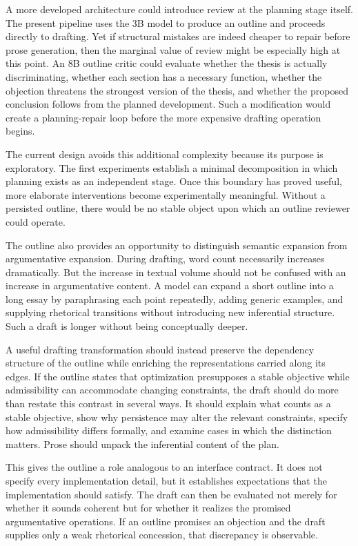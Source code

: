\documentclass[11pt]{article}
\begin{document}
A more developed architecture could introduce review at the planning stage itself. The present pipeline uses the 3B model to produce an outline and proceeds directly to drafting. Yet if structural mistakes are indeed cheaper to repair before prose generation, then the marginal value of review might be especially high at this point. An 8B outline critic could evaluate whether the thesis is actually discriminating, whether each section has a necessary function, whether the objection threatens the strongest version of the thesis, and whether the proposed conclusion follows from the planned development. Such a modification would create a planning-repair loop before the more expensive drafting operation begins.

The current design avoids this additional complexity because its purpose is exploratory. The first experiments establish a minimal decomposition in which planning exists as an independent stage. Once this boundary has proved useful, more elaborate interventions become experimentally meaningful. Without a persisted outline, there would be no stable object upon which an outline reviewer could operate.

The outline also provides an opportunity to distinguish semantic expansion from argumentative expansion. During drafting, word count necessarily increases dramatically. But the increase in textual volume should not be confused with an increase in argumentative content. A model can expand a short outline into a long essay by paraphrasing each point repeatedly, adding generic examples, and supplying rhetorical transitions without introducing new inferential structure. Such a draft is longer without being conceptually deeper.

A useful drafting transformation should instead preserve the dependency structure of the outline while enriching the representations carried along its edges. If the outline states that optimization presupposes a stable objective while admissibility can accommodate changing constraints, the draft should do more than restate this contrast in several ways. It should explain what counts as a stable objective, show why persistence may alter the relevant constraints, specify how admissibility differs formally, and examine cases in which the distinction matters. Prose should unpack the inferential content of the plan.

This gives the outline a role analogous to an interface contract. It does not specify every implementation detail, but it establishes expectations that the implementation should satisfy. The draft can then be evaluated not merely for whether it sounds coherent but for whether it realizes the promised argumentative operations. If an outline promises an objection and the draft supplies only a weak rhetorical concession, that discrepancy is observable.
\end{document}
